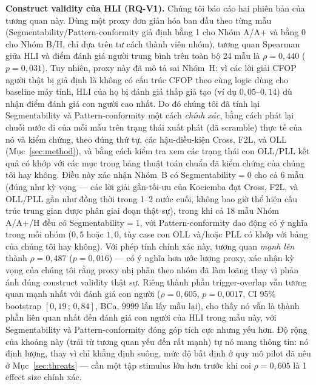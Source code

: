 \documentclass[10pt,conference]{article}
\begin{document}
\textbf{Construct validity của HLI (RQ-V1).} Chúng tôi báo cáo hai
phiên bản của tương quan này. Dùng một proxy đơn giản hóa ban đầu theo
từng mẫu (Segmentability/Pattern-conformity giả định bằng 1 cho Nhóm
A/A+ và bằng 0 cho Nhóm B/H, chỉ dựa trên tư cách thành viên nhóm),
tương quan Spearman giữa HLI và điểm đánh giá người trung bình trên
toàn bộ 24 mẫu là $\rho=0,440$ ($p=0,031$). Tuy nhiên, proxy này đã mô
tả sai Nhóm~H: vì các lời giải CFOP người thật bị giả định là không có
cấu trúc CFOP theo cùng logic dùng cho baseline máy tính, HLI của họ bị
đánh giá thấp giả tạo (ví dụ $0,05$--$0,14$) dù nhận điểm đánh giá con
người cao nhất. Do đó chúng tôi đã tính lại Segmentability và
Pattern-conformity một cách \emph{chính xác}, bằng cách phát lại chuỗi
nước đi của mỗi mẫu trên trạng thái xuất phát (đã scramble) thực tế của
nó và kiểm chứng, theo đúng thứ tự, các hậu-điều-kiện Cross, F2L, và
OLL (Mục~\ref{sec:method}), và bằng cách kiểm tra xem các trạng thái
con OLL/PLL kết quả có khớp với các mục trong bảng thuật toán chuẩn đã
kiểm chứng của chúng tôi hay không. Điều này xác nhận Nhóm~B có
Segmentability$=0$ cho cả 6 mẫu (đúng như kỳ vọng — các lời giải
gần-tối-ưu của Kociemba đạt Cross, F2L, và OLL/PLL gần như đồng thời
trong 1--2 nước cuối, không bao giờ thể hiện cấu trúc trung gian được
phân giai đoạn thật sự), trong khi cả 18 mẫu Nhóm A/A+/H đều có
Segmentability$=1$, với Pattern-conformity dao động có ý nghĩa trong
mỗi nhóm ($0,5$ hoặc $1,0$, tùy case con OLL và/hoặc PLL có khớp với
bảng của chúng tôi hay không). Với phép tính chính xác này, tương quan
\emph{mạnh lên} thành $\rho=0,487$ ($p=0,016$) — có ý nghĩa hơn ước
lượng proxy, xác nhận kỳ vọng của chúng tôi rằng proxy nhị phân theo
nhóm đã làm loãng thay vì phản ánh đúng construct validity thật sự.
Riêng thành phần trigger-overlap vẫn tương quan mạnh nhất với đánh giá
con người ($\rho=0,605$, $p=0,0017$, CI 95\% bootstrap $[0,19\,;\,0,84]$,
BCa, $9999$ lần lấy mẫu lại), cho thấy nó vẫn là thành phần
liên quan nhất đến đánh giá con người của HLI trong mẫu này, với
Segmentability và Pattern-conformity đóng góp tích cực nhưng yếu hơn.
Độ rộng của khoảng này (trải từ tương quan yếu đến rất mạnh) tự nó
mang thông tin: nó định lượng, thay vì chỉ khẳng định suông, mức độ
bất định ở quy mô pilot đã nêu ở Mục~\ref{sec:threats} — cần một tập
stimulus lớn hơn trước khi coi $\rho=0,605$ là 1 effect size chính
xác.

\end{document}
